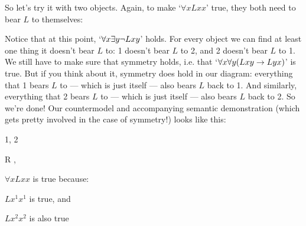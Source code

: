 So let's try it with two objects.  Again, to make `$\forall xLxx$' true, they both need to bear $L$ to themselves:
\begin{center}\end{center}
Notice that at this point, `$\forall x \exists y \neg Lxy$' holds.  For every object we can find at least one thing it doesn't bear $L$ to: 1 doesn't bear $L$ to 2, and 2 doesn't bear $L$ to 1.  We still have to make sure that symmetry holds, i.e. that `$\forall x\forall y(Lxy \rightarrow Lyx)$' is true.  But if you think about it, symmetry does hold in our diagram: everything that 1 bears $L$ to --- which is just itself --- also bears $L$ back to 1.  And similarly, everything that 2 bears $L$ to --- which is just itself --- also bears $L$ back to 2.  So we're done!  Our countermodel and accompanying semantic demonstration (which gets pretty involved in the case of symmetry!) looks like this:
\begin{center}
\begin{minipage}{0.8\textwidth}
\begin{multicols}{2}
\begin{ekey}
	\item[\text{Domain}] 1, 2
	\item[R] , 
\end{ekey}
\columnbreak
{}
\end{multicols}\end{minipage}\end{center}

\begin{ebullet}
\item $\forall xLxx$ is true because:
\begin{etriangle}
\item $Lx^1x^1$ is true, and
\item $Lx^2x^2$ is also true
\end{etriangle}
\end{ebullet}

